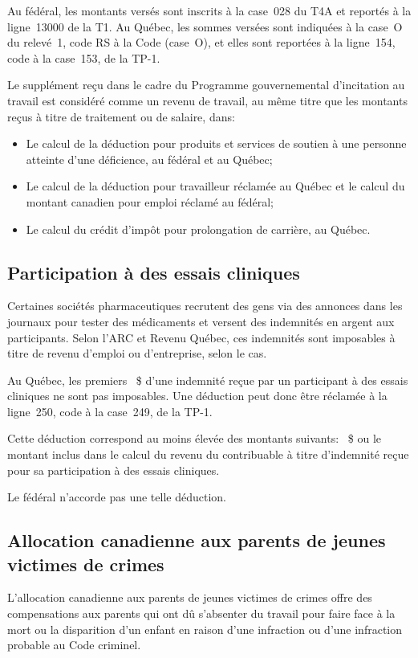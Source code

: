 Au fédéral, les montants versés sont inscrits à la case~028 du T4A et reportés à la ligne~13000 de la T1. Au Québec, les sommes versées sont indiquées à la case~O du relevé~1, code \og RS \fg{} à la Code (case~O), et elles sont reportées à la ligne~154, code  \fg{} à la case~153, de la TP-1.

Le supplément reçu dans le cadre du Programme gouvernemental d'incitation au travail est considéré comme un revenu de travail, au même titre que les montants reçus à titre de traitement ou de salaire, dans:
\begin{itemize}
	\item Le calcul de la déduction pour produits et services de soutien à une personne atteinte d'une déficience, au fédéral et au Québec;
	\item Le calcul de la déduction pour travailleur réclamée au Québec et le calcul du montant canadien pour emploi réclamé au fédéral;
	\item Le calcul du crédit d'impôt pour prolongation de carrière, au Québec.
\end{itemize}


\subsection{Participation à des essais cliniques}
Certaines sociétés pharmaceutiques recrutent des gens via des annonces dans les journaux pour tester des médicaments et versent des indemnités en argent aux participants. Selon l'ARC et Revenu Québec, ces indemnités sont imposables à titre de revenu d'emploi ou d'entreprise, selon le cas.

Au Québec, les premiers ~\$ d'une indemnité reçue par un participant à des essais cliniques ne sont pas imposables. Une déduction peut donc être réclamée à la ligne~250, code  \fg{} à la case~249, de la TP-1.

Cette déduction correspond au moins élevée des montants suivants: ~\$ ou le montant inclus dans le calcul du revenu du contribuable à titre d'indemnité reçue pour sa participation à des essais cliniques. 

Le fédéral n'accorde pas une telle déduction.


\subsection{Allocation canadienne aux parents de jeunes victimes de crimes}
L'allocation canadienne aux parents de jeunes victimes de crimes offre des compensations aux parents qui ont dû s'absenter du travail pour faire face à la mort ou la disparition d'un enfant en raison d'une infraction ou d'une infraction probable au Code criminel.

